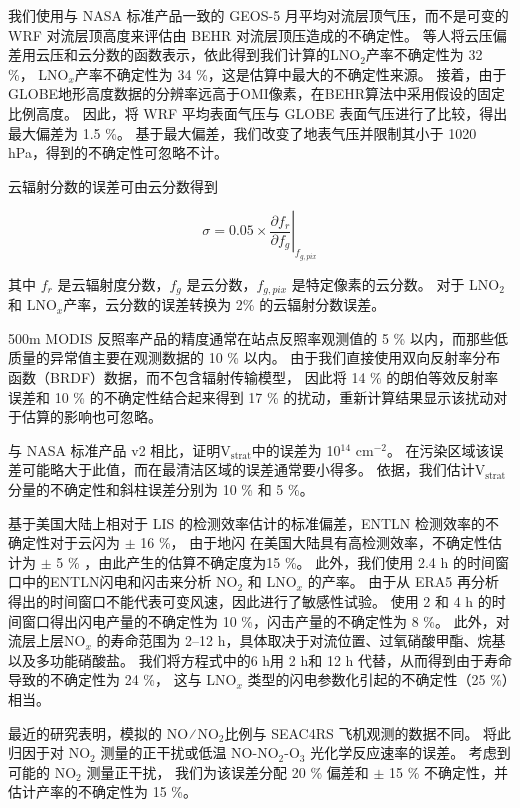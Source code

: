 我们使用与 NASA 标准产品一致的 GEOS-5 月平均对流层顶气压，而不是可变的 WRF 对流层顶高度来评估由 BEHR 对流层顶压造成的不确定性。
\citet{Acarreta.2004}等人将云压偏差用云压和云分数的函数表示，依此得到我们计算的LNO$_2$产率不确定性为 32 \%，
LNO$_x$产率不确定性为 34 \%，这是估算中最大的不确定性来源。
接着，由于GLOBE地形高度数据的分辨率远高于OMI像素，在BEHR算法中采用假设的固定比例高度。
因此，\citet{Laughner.2019a}将 WRF 平均表面气压与 GLOBE 表面气压进行了比较，得出最大偏差为 1.5 \%。
基于最大偏差，我们改变了地表气压并限制其小于 1020 hPa，得到的不确定性可忽略不计。

云辐射分数的误差可由云分数得到

\begin{equation}
\sigma = 0.05 \times \left.\frac{\partial{f_r}}{\partial{f_g}}\right|_{f_{g,pix}}
\end{equation}

其中 $f_r$ 是云辐射度分数，$f_g$ 是云分数，$f_{g,pix}$ 是特定像素的云分数。
对于 LNO$_2$ 和 LNO$_x$产率，云分数的误差转换为 2\% 的云辐射分数误差。

500m MODIS 反照率产品的精度通常在站点反照率观测值的 5 \% 以内，而那些低质量的异常值主要在观测数据的 10 \% 以内\citep{Schaaf.2011}。
由于我们直接使用双向反射率分布函数（BRDF）数据，而不包含辐射传输模型，
因此将 14 \% 的朗伯等效反射率误差和 10 \% 的不确定性结合起来得到 17 \% 的扰动\citep{Laughner.2019a}，重新计算结果显示该扰动对于估算的影响也可忽略。

与 NASA 标准产品 v2 相比，\citet{Krotkov.2017}证明V$_\textrm{strat}$中的误差为 10$^{14}$ cm$^{-2}$。
在污染区域该误差可能略大于此值，而在最清洁区域的误差通常要小得多\citep{Bucsela.2013}。
依据\citet{Allen.2019}，我们估计V$_\textrm{strat}$分量的不确定性和斜柱误差分别为 10 \% 和 5 \%。

基于美国大陆上相对于 LIS 的检测效率估计的标准偏差，ENTLN 检测效率的不确定性对于云闪为 $\pm$ 16 \%，
由于地闪 在美国大陆具有高检测效率，不确定性估计为 $\pm$ 5 \% \citep{Lapierre.2020}，由此产生的估算不确定度为15 \%。
此外，我们使用 2.4 h 的时间窗口中的ENTLN闪电和闪击来分析 NO$_2$ 和 LNO$_x$ 的产率。
由于从 ERA5 再分析得出的时间窗口不能代表可变风速，因此进行了敏感性试验。
使用 2 和 4 h 的时间窗口得出闪电产量的不确定性为 10 \%，闪击产量的不确定性为 8 \%。
此外，对流层上层NO$_x$ 的寿命范围为 2--12 h，具体取决于对流位置、过氧硝酸甲酯、烷基以及多功能硝酸盐\citep{Nault.2017}。
我们将方程式中的6 h用 2 h和 12 h 代替，从而得到由于寿命导致的不确定性为 24 \%，
这与 LNO$_x$ 类型的闪电参数化引起的不确定性（25 \%）相当。

最近的研究表明，模拟的 NO ∕ NO$_2$比例与 SEAC4RS 飞机观测的数据不同\citep{Travis.2016,Silvern.2018}。
\citet{Silvern.2018}将此归因于对 NO$_2$ 测量的正干扰或低温 NO-NO$_2$-O$_3$ 光化学反应速率的误差。
考虑到可能的 NO$_2$ 测量正干扰\citep{Allen.2019,Bucsela.2019}，
我们为该误差分配 20 \% 偏差和 $\pm$ 15 \% 不确定性，并估计产率的不确定性为 15 \%。

